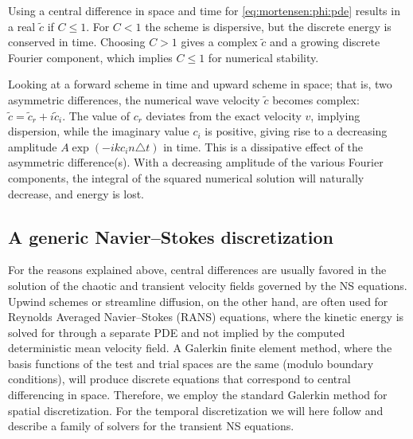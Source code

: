 Using a central difference in space and time for
\eqref{eq:mortensen:phi:pde} results in a real $\tilde c$ if $C\leqslant
1$. For $C<1$ the scheme is dispersive, but the discrete energy is
conserved in time.  Choosing $C>1$ gives a complex $\tilde c$ and a
growing discrete Fourier component, which implies $C\leqslant1$ for
numerical stability.

Looking at a forward scheme in time and upward scheme in space; that is,
two asymmetric differences, the numerical wave velocity $\tilde c$
becomes complex: $\tilde c = \tilde c_r + i\tilde c_i$.  The value of
$c_r$ deviates from the exact velocity $v$, implying dispersion, while
the imaginary value $c_i$ is positive, giving rise to a decreasing
amplitude $A\exp{(-ikc_i n\triangle t)}$ in time.  This is a
dissipative effect of the asymmetric difference(s).  With a decreasing
amplitude of the various Fourier components, the integral of the
squared numerical solution will naturally decrease, and energy is
lost.

\subsection{A generic Navier--Stokes discretization}
\label{sec:mortensen:NS-solver}

For the reasons explained above, central differences are usually
favored in the solution of the chaotic and transient velocity fields
governed by the NS equations. Upwind schemes or streamline diffusion,
on the other hand, are often used for Reynolds Averaged Navier--Stokes
(RANS) equations, where the kinetic energy is solved for through a
separate PDE and not implied by the computed deterministic mean
velocity field. A Galerkin finite element method, where the basis
functions of the test and trial spaces are the same (modulo boundary
conditions), will produce discrete equations that correspond to
central differencing in space. Therefore, we employ the standard
Galerkin method for spatial discretization. For the temporal
discretization we will here follow
\citet{SimoArmero1994} and describe a family of solvers for the
transient NS equations.


